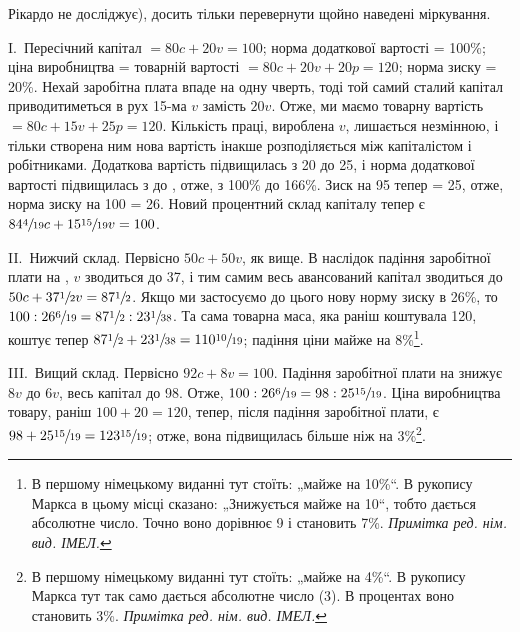 \parcont{}  %
Рікардо не досліджує), досить тільки перевернути щойно наведені
міркування.

I.~Пересічний капітал $= 80 c + 20 v = 100$; норма додаткової
вартості = 100\%; ціна виробництва = товарній вартості $= 80 c +
20 v + 20 p = 120$; норма зиску = 20\%. Нехай заробітна плата
впаде на одну чверть, тоді той самий сталий капітал приводитиметься
в рух 15-ма $v$ замість $20 v$. Отже, ми маємо товарну
вартість $ = 80 c + 15 v + 25 p = 120$. Кількість праці, вироблена $v$,
лишається  незмінною, і тільки створена ним нова вартість інакше
розподіляється між капіталістом і робітниками. Додаткова вартість
підвищилась з 20 до 25, і норма додаткової вартості
підвищилась з  до , отже, з 100\% до 166\%.
Зиск на 95 тепер = 25, отже, норма зиску на 100 = 26. Новий
процентний склад капіталу тепер є $84\sfrac{4}{19}c + 15\sfrac{15}{19}v = 100$.

II.~Нижчий склад. Первісно $50 c + 50 v$, як вище. В наслідок
падіння заробітної плати на , $v$ зводиться до 37, і тим самим
весь авансований капітал зводиться до $50 c + 37\sfrac{1}{2}v = 87\sfrac{1}{2}$. Якщо
ми застосуємо до цього нову норму зиску в 26\%, то
$100 : 26\sfrac{6}{19} = 87\sfrac{1}{2} : 23\sfrac{1}{38}$. Та сама товарна маса,
яка раніш коштувала 120, коштує
тепер $87\sfrac{1}{2} + 23\sfrac{1}{38} = 110\sfrac{10}{19}$; падіння ціни
майже на 8\%\footnote*{
В першому німецькому виданні тут стоїть: „майже на 10\%“. В рукопису
Маркса в цьому місці сказано: „Знижується майже на 10“, тобто дається абсолютне
число. Точно воно дорівнює 9 і становить 7\%. \emph{Примітка ред. нім. вид. ІМЕЛ.}
}.

III.~Вищий склад. Первісно $92 c + 8 v = 100$. Падіння заробітної
плати на  знижує $8 v$ до $6 v$, весь капітал до 98. Отже,
$100 : 26\sfrac{6}{19} = 98 : 25\sfrac{15}{19}$. Ціна виробництва товару,
раніш $100 + 20 = 120$, тепер, після падіння заробітної плати, є
$98 + 25\sfrac{15}{19} = 123\sfrac{15}{19}$;
отже, вона підвищилась більше ніж на 3\%\footnote*{
В першому німецькому виданні тут стоїть: „майже на 4\%“. В рукопису
Маркса тут так само дається абсолютне число (3). В процентах воно
становить 3\%. \emph{Примітка ред. нім. вид. ІМЕЛ.}
}.

